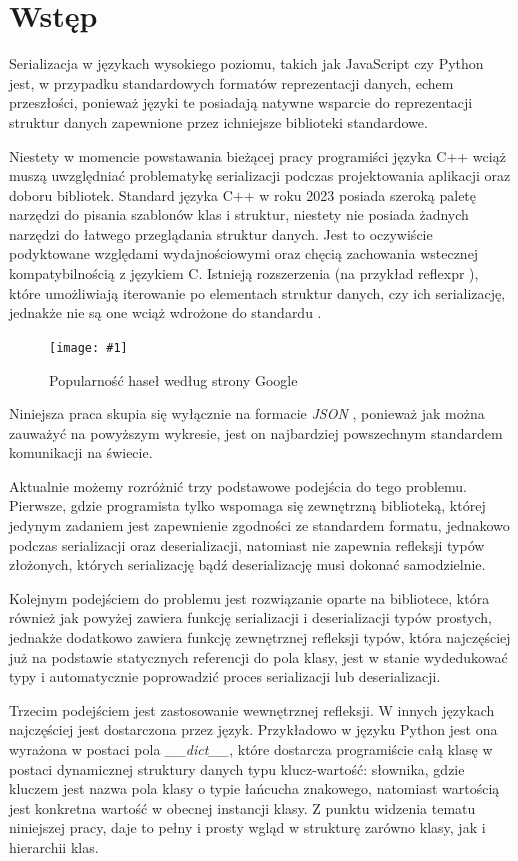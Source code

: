 \documentclass[12pt]{article}
\newcommand{\n}{\newline}
\newcommand{\putfig}[3]{
	\begin{figure}[H]
	\centering
	\texttt{[image: \#1]}
	\caption{#2}
	\label{#3}
	\medskip
\end{figure}
}
\newcommand{\nonpl}[1]{{\it #1}}
\newcommand{\code}[1]{{\it #1}}
\newcommand{\JSON}{\nonpl{JSON} }
\begin{document}
	{
		\section{Wstęp}

		Serializacja w językach wysokiego poziomu, takich jak JavaScript czy Python jest, w przypadku standardowych formatów
		reprezentacji danych, echem przeszłości, ponieważ języki te posiadają natywne wsparcie do reprezentacji struktur danych
		zapewnione przez ichniejsze biblioteki standardowe.\n

		Niestety w momencie powstawania bieżącej pracy programiści języka C++ wciąż muszą uwzględniać problematykę
		serializacji podczas projektowania aplikacji oraz doboru bibliotek. Standard języka C++ w roku 2023 posiada szeroką
		paletę narzędzi do pisania szablonów klas i struktur, niestety nie posiada żadnych narzędzi do łatwego przeglądania
		struktur danych. Jest to oczywiście podyktowane względami wydajnościowymi oraz chęcią zachowania wstecznej
		kompatybilnością z językiem C. Istnieją rozszerzenia (na przykład reflexpr \cite*{cpp_extension_reflexpr_iso}), które
		umożliwiają iterowanie po elementach struktur danych, czy ich serializację, jednakże nie są one wciąż wdrożone do
		standardu \cite*{cpp_extension_reflexpr_short}.\n

		\putfig{./charts/output_with_charts_as_images/json_vs_other_formats.png}{ Popularność haseł według strony Google \cite*{google_trends_json_api_vs_rest_of_the_world}}{json_vs_world}

		Niniejsza praca skupia się wyłącznie na formacie \JSON\cite*{json_iso}, ponieważ jak można zauważyć na powyższym wykresie, jest on
		najbardziej powszechnym standardem komunikacji na świecie.\n

		Aktualnie możemy rozróżnić trzy podstawowe podejścia do tego problemu. Pierwsze, gdzie programista tylko wspomaga się
		zewnętrzną biblioteką, której jedynym zadaniem jest zapewnienie zgodności ze standardem formatu, jednakowo podczas serializacji
		oraz deserializacji, natomiast nie zapewnia refleksji typów złożonych, których serializację bądź deserializację musi
		dokonać samodzielnie.\n

		Kolejnym podejściem do problemu jest rozwiązanie oparte na bibliotece, która również jak powyżej zawiera funkcję
		serializacji i deserializacji typów prostych, jednakże dodatkowo zawiera funkcję zewnętrznej refleksji typów,
		która najczęściej już na podstawie statycznych referencji do pola klasy, jest w stanie wydedukować typy i automatycznie
		poprowadzić proces serializacji lub deserializacji.\n

		Trzecim podejściem jest zastosowanie wewnętrznej refleksji. W innych językach najczęściej jest dostarczona przez język.
		Przykładowo w języku Python jest ona wyrażona w postaci pola \code{\_\_dict\_\_}, które dostarcza programiście całą klasę
		w postaci dynamicznej struktury danych typu klucz-wartość: słownika, gdzie kluczem jest nazwa pola klasy o typie
		łańcucha znakowego, natomiast wartością jest konkretna wartość w obecnej instancji klasy. Z punktu widzenia tematu
		niniejszej pracy, daje to pełny i prosty wgląd w strukturę zarówno klasy, jak i hierarchii klas.
	}
\end{document}
